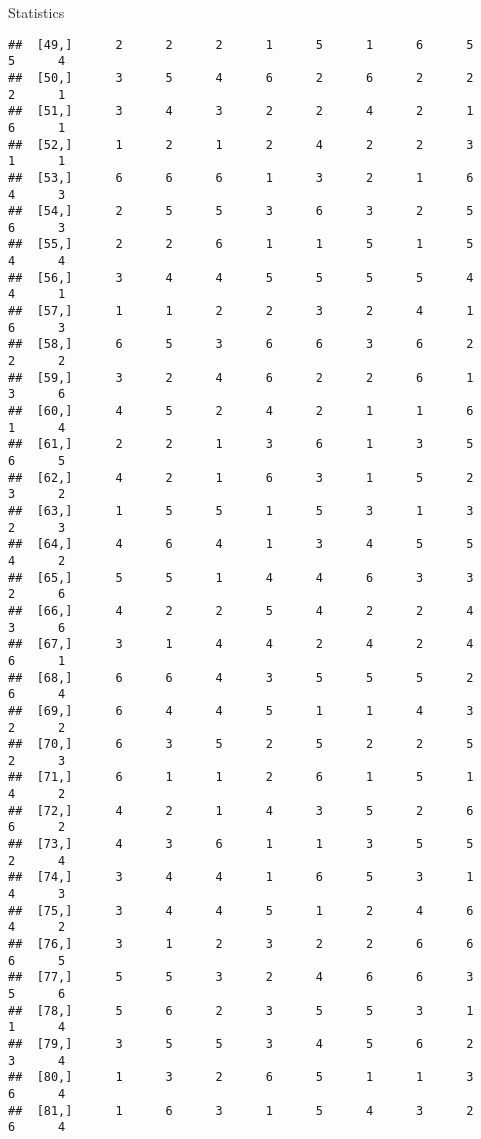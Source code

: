 \documentclass[
  ignorenonframetext,
]{beamer}
\begin{document}
\begin{frame}[fragile]{Statistics}
\begin{verbatim}
##  [49,]      2      2      2      1      5      1      6      5      5      4
##  [50,]      3      5      4      6      2      6      2      2      2      1
##  [51,]      3      4      3      2      2      4      2      1      6      1
##  [52,]      1      2      1      2      4      2      2      3      1      1
##  [53,]      6      6      6      1      3      2      1      6      4      3
##  [54,]      2      5      5      3      6      3      2      5      6      3
##  [55,]      2      2      6      1      1      5      1      5      4      4
##  [56,]      3      4      4      5      5      5      5      4      4      1
##  [57,]      1      1      2      2      3      2      4      1      6      3
##  [58,]      6      5      3      6      6      3      6      2      2      2
##  [59,]      3      2      4      6      2      2      6      1      3      6
##  [60,]      4      5      2      4      2      1      1      6      1      4
##  [61,]      2      2      1      3      6      1      3      5      6      5
##  [62,]      4      2      1      6      3      1      5      2      3      2
##  [63,]      1      5      5      1      5      3      1      3      2      3
##  [64,]      4      6      4      1      3      4      5      5      4      2
##  [65,]      5      5      1      4      4      6      3      3      2      6
##  [66,]      4      2      2      5      4      2      2      4      3      6
##  [67,]      3      1      4      4      2      4      2      4      6      1
##  [68,]      6      6      4      3      5      5      5      2      6      4
##  [69,]      6      4      4      5      1      1      4      3      2      2
##  [70,]      6      3      5      2      5      2      2      5      2      3
##  [71,]      6      1      1      2      6      1      5      1      4      2
##  [72,]      4      2      1      4      3      5      2      6      6      2
##  [73,]      4      3      6      1      1      3      5      5      2      4
##  [74,]      3      4      4      1      6      5      3      1      4      3
##  [75,]      3      4      4      5      1      2      4      6      4      2
##  [76,]      3      1      2      3      2      2      6      6      6      5
##  [77,]      5      5      3      2      4      6      6      3      5      6
##  [78,]      5      6      2      3      5      5      3      1      1      4
##  [79,]      3      5      5      3      4      5      6      2      3      4
##  [80,]      1      3      2      6      5      1      1      3      6      4
##  [81,]      1      6      3      1      5      4      3      2      6      4

\end{verbatim}
\end{frame}
\end{document}
